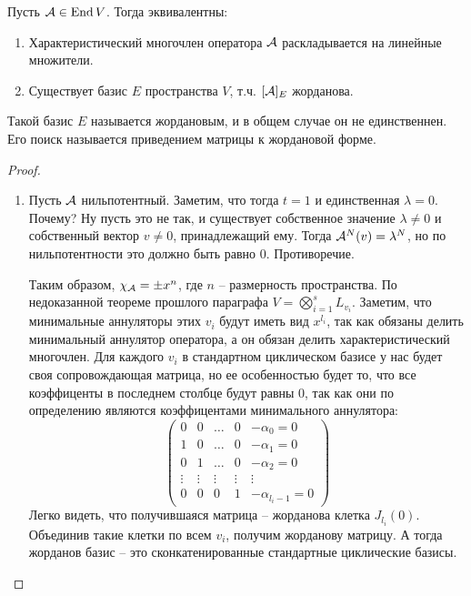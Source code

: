 \begin{theorem-non}
    Пусть $\mathcal{A} \in \operatorname{End} V$. Тогда эквивалентны: \begin{enumerate}
        \item Характеристический многочлен оператора $\mathcal{A}$ раскладывается на линейные множители.
        \item Существует базис $E$ пространства $V$, т.ч. $[\mathcal{A}]_E$ жорданова. 
    \end{enumerate}
    Такой базис $E$ называется жордановым, и в общем случае он не единственнен. 
    Его поиск называется приведением матрицы к жордановой форме.
\end{theorem-non}
\begin{proof} \quad 

    \begin{enumerate}
        \item Пусть $\mathcal{A}$ нильпотентный.
        Заметим, что тогда $t = 1$ и единственная $\lambda = 0$.
        Почему? Ну пусть это не так, и существует собственное значение $\lambda \neq 0$ и собственный вектор $v \neq 0$, принадлежащий ему.
        Тогда $\mathcal{A}^N(v) = \lambda^N$, но по нильпотентности это должно быть равно 0. Противоречие.
    
        Таким образом, $\chi_{\mathcal{A}} = \pm x^n$, где $n$ -- размерность пространства.
        По недоказанной теореме прошлого параграфа $V = \bigotimes\limits_{i=1}^s L_{v_i}$.
        Заметим, что минимальные аннуляторы этих $v_i$ будут иметь вид $x^{l_i}$, так как обязаны делить минимальный аннулятор оператора, а он обязан делить характеристический многочлен.
        Для каждого $v_i$ в стандартном циклическом базисе у нас будет своя сопровождающая матрица, но ее особенностью будет то, что все коэффиценты в последнем столбце будут равны 0, так как они по определению являются коэффицентами минимального аннулятора:
        \[
            \left(\begin{array}{ccccc}
            0 & 0 & \dots & 0 & -\alpha_0 = 0 \\ 
            1 & 0 & \dots & 0 & -\alpha_1 = 0 \\ 
            0 & 1 & \dots & 0 & -\alpha_2 = 0 \\ 
            \vdots & \vdots & \vdots & \vdots & \vdots \\ 
            0 & 0 & 0 & 1 & -\alpha_{l_i - 1} = 0
        \end{array}\right)    
        \]
        Легко видеть, что получившаяся матрица -- жорданова клетка $J_{l_i}(0)$. 
        Объединив такие клетки по всем $v_i$, получим жорданову матрицу. 
        А тогда жорданов базис -- это сконкатенированные стандартные циклические базисы.


\end{enumerate}
\end{proof}
